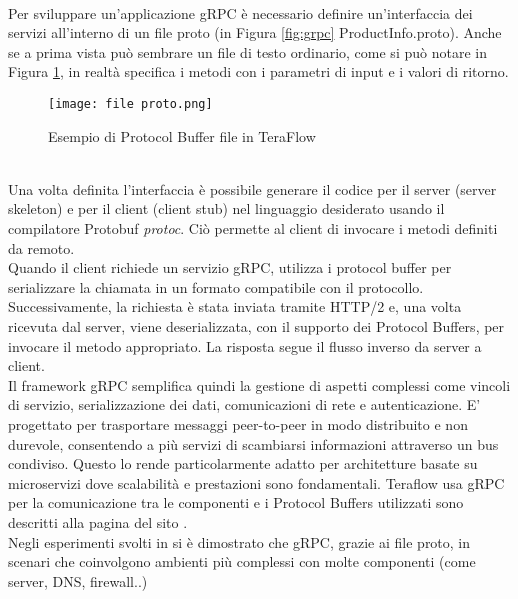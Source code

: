\\Per sviluppare un'applicazione gRPC è necessario definire un'interfaccia dei servizi %
all'interno di un file proto (in Figura \ref{fig:grpc} ProductInfo.proto).
Anche se a prima vista può sembrare un file di testo ordinario, come si può notare in Figura \ref{fig:proto}, in realtà specifica i metodi con i parametri di input e i valori di ritorno.
\begin{figure}[h]
    \centering
   \texttt{[image: file proto.png]}
    \caption{Esempio di Protocol Buffer file in TeraFlow \cite{ProtoBuf}}
    \label{fig:proto}
\end{figure}
\\Una volta definita l'interfaccia è possibile generare il codice per il server (server skeleton) e per il client (client stub) nel linguaggio desiderato usando il compilatore Protobuf \textit{protoc}\cite{librogrpc}.
Ciò permette al client di invocare i metodi definiti da remoto.
\\Quando il client richiede un servizio gRPC, utilizza i protocol buffer per serializzare la chiamata in un formato compatibile con il protocollo. 
Successivamente, la richiesta è stata inviata tramite HTTP/2 e, una volta ricevuta dal server, viene deserializzata, con il supporto dei Protocol Buffers, per invocare il metodo appropriato.
La risposta segue il flusso inverso da server a client\cite{librogrpc}.
\\Il framework gRPC semplifica quindi la gestione di aspetti complessi come vincoli di servizio, serializzazione dei dati, comunicazioni di rete e autenticazione.
E' progettato per trasportare messaggi peer-to-peer in modo distribuito e non durevole, consentendo a più servizi di scambiarsi informazioni attraverso un bus condiviso.
Questo lo rende particolarmente adatto per architetture basate su microservizi dove scalabilità e prestazioni sono fondamentali.
Teraflow usa gRPC per la comunicazione tra le componenti e i Protocol Buffers utilizzati sono descritti alla pagina del sito \cite{ProtoBuf}.
\\Negli esperimenti svolti in \cite{espgrpc} si è dimostrato che gRPC, grazie ai file proto, in scenari che coinvolgono ambienti più complessi con molte componenti (come server, DNS, firewall..)
